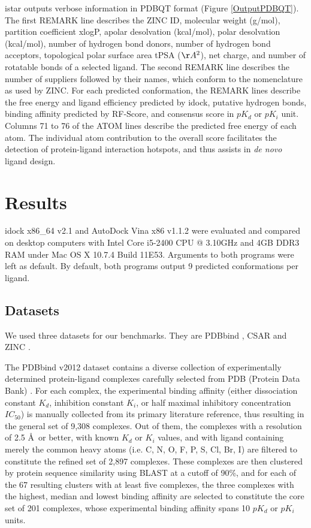 \documentclass[10pt]{article}
\begin{document}
istar outputs verbose information in PDBQT format (Figure \ref{OutputPDBQT}). The first REMARK line describes the ZINC ID, molecular weight (g/mol), partition coefficient xlogP, apolar desolvation (kcal/mol), polar desolvation (kcal/mol), number of hydrogen bond donors, number of hydrogen bond acceptors, topological polar surface area tPSA ($\AA^2$), net charge, and number of rotatable bonds of a selected ligand. The second REMARK line describes the number of suppliers followed by their names, which conform to the nomenclature as used by ZINC. For each predicted conformation, the REMARK lines describe the free energy and ligand efficiency predicted by idock, putative hydrogen bonds, binding affinity predicted by RF-Score, and consensus score in $pK_d$ or $pK_i$ unit. Columns 71 to 76 of the ATOM lines describe the predicted free energy of each atom. The individual atom contribution to the overall score facilitates the detection of protein-ligand interaction hotspots, and thus assists in \textit{de novo} ligand design.

\section*{Results}
idock x86\_64 v2.1 and AutoDock Vina x86 v1.1.2 were evaluated and compared on desktop computers with Intel Core i5-2400 CPU @ 3.10GHz and 4GB DDR3 RAM under Mac OS X 10.7.4 Build 11E53. Arguments to both programs were left as default. By default, both programs output 9 predicted conformations per ligand.

\subsection*{Datasets}
We used three datasets for our benchmarks. They are PDBbind \cite{529,530}, CSAR \cite{857,960} and ZINC \cite{532,1178}.

The PDBbind v2012 dataset contains a diverse collection of experimentally determined protein-ligand complexes carefully selected from PDB (Protein Data Bank) \cite{540,537}. For each complex, the experimental binding affinity (either dissociation constant $K_d$, inhibition constant $K_i$, or half maximal inhibitory concentration $IC_{50}$) is manually collected from its primary literature reference, thus resulting in the general set of 9,308 complexes. Out of them, the complexes with a resolution of 2.5 \AA\ or better, with known $K_d$ or $K_i$ values, and with ligand containing merely the common heavy atoms (i.e. C, N, O, F, P, S, Cl, Br, I) are filtered to constitute the refined set of 2,897 complexes. These complexes are then clustered by protein sequence similarity using BLAST at a cutoff of 90\%, and for each of the 67 resulting clusters with at least five complexes, the three complexes with the highest, median and lowest binding affinity are selected to constitute the core set of 201 complexes, whose experimental binding affinity spans 10 $pK_d$ or $pK_i$ units.
\end{document}
